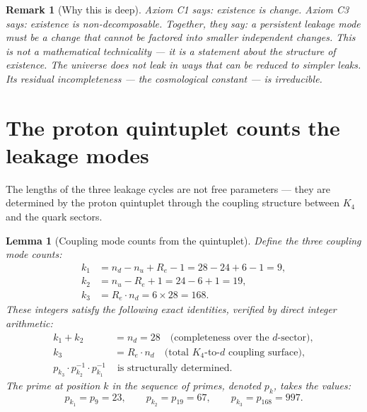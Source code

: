 \documentclass[12pt,a4paper]{article}
\newtheorem{lemma}[theorem]{Lemma}
\newtheorem{remark}[theorem]{Remark}
\newcommand{\Kfour}{K_4}
\renewcommand{\Re}{R_e}
\newcommand{\pk}[1]{p_{#1}}
\begin{document}
\begin{remark}[Why this is deep]
Axiom C1 says: existence is change. Axiom C3 says: existence is non-decomposable. Together, they say: a persistent leakage mode must be a change that cannot be factored into smaller independent changes. This is not a mathematical technicality — it is a statement about the structure of existence. The universe does not leak in ways that can be reduced to simpler leaks. Its residual incompleteness — the cosmological constant — is irreducible.
\end{remark}

\section{The proton quintuplet counts the leakage modes}
\label{sec:indices}

The lengths of the three leakage cycles are not free parameters — they are determined by the proton quintuplet through the coupling structure between $\Kfour$ and the quark sectors.

\begin{lemma}[Coupling mode counts from the quintuplet]
\label{lem:indices}
Define the three coupling mode counts:
\begin{align}
k_1 &= n_d - n_u + \Re - 1 = 28 - 24 + 6 - 1 = 9, \label{eq:k1} \\
k_2 &= n_u - \Re + 1 = 24 - 6 + 1 = 19, \label{eq:k2} \\
k_3 &= \Re \cdot n_d = 6 \times 28 = 168. \label{eq:k3}
\end{align}
These integers satisfy the following exact identities, verified by direct integer arithmetic:
\begin{align}
k_1 + k_2 &= n_d = 28 \quad \text{(completeness over the $d$-sector)}, \label{eq:k1k2} \\
k_3 &= \Re \cdot n_d \quad \text{(total $\Kfour$-to-$d$ coupling surface)}, \label{eq:k3_id} \\
\pk{k_3} \cdot \pk{k_2}^{-1} \cdot \pk{k_1}^{-1} &\text{ is structurally determined}. \label{eq:prod}
\end{align}
The prime at position $k$ in the sequence of primes, denoted $\pk{k}$, takes the values:
\[
\pk{k_1} = \pk{9} = 23, \qquad \pk{k_2} = \pk{19} = 67, \qquad \pk{k_3} = \pk{168} = 997.
\]
\end{lemma}
\end{document}
